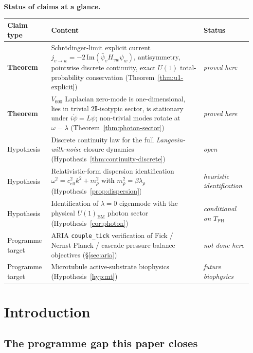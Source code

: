 \documentclass[11pt]{article}
\theoremstyle{definition}
\newcommand{\twoI}{2\mathbf{I}}
\begin{document}
\noindent\textbf{Status of claims at a glance.}

\begin{center}\small
\begin{tabular}{@{}p{2.4cm}p{8.2cm}p{3.2cm}@{}}
\toprule
Claim type & Content & Status \\
\midrule
\textbf{Theorem} & Schr\"{o}dinger-limit explicit current $j_{v\to w} = -2\,\mathrm{Im}(\bar\psi_v H_{vw}\psi_w)$, antisymmetry, pointwise discrete continuity, exact $U(1)$ total-probability conservation (Theorem~\ref{thm:u1-explicit}) & \emph{proved here} \\
\textbf{Theorem} & $V_{600}$ Laplacian zero-mode is one-dimensional, lies in trivial $\twoI$-isotypic sector, is stationary under $i\dot\psi=L\psi$; non-trivial modes rotate at $\omega = \lambda$ (Theorem~\ref{thm:photon-sector}) & \emph{proved here} \\
\midrule
Hypothesis & Discrete continuity law for the full \emph{Langevin-with-noise} closure dynamics (Hypothesis~\ref{thm:continuity-discrete}) & \emph{open} \\
Hypothesis & Relativistic-form dispersion identification $\omega^2 = c_{\mathrm{eff}}^2 k^2 + m_\rho^2$ with $m_\rho^2 = \beta\lambda_\rho$ (Hypothesis~\ref{prop:dispersion}) & \emph{heuristic identification} \\
Hypothesis & Identification of $\lambda = 0$ eigenmode with the physical $U(1)_{\mathrm{EM}}$ photon sector (Hypothesis~\ref{cor:photon}) & \emph{conditional on $T_{\mathrm{PH}}$} \\
\midrule
Programme target & ARIA \texttt{couple\_tick} verification of Fick / Nernst-Planck / cascade-pressure-balance objectives (\S\ref{sec:aria}) & \emph{not done here} \\
Programme target & Microtubule active-substrate biophysics (Hypothesis~\ref{hyp:mt}) & \emph{future biophysics} \\
\bottomrule
\end{tabular}
\end{center}

\tableofcontents

\section{Introduction}\label{sec:intro}

\subsection{The programme gap this paper closes}
\end{document}
